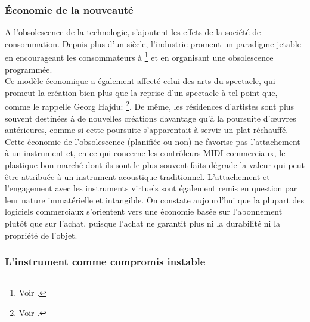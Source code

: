 
\subsubsection{Économie de la nouveauté}

\noindent A l'obsolescence de la technologie, s'ajoutent les effets de la société de consommation. Depuis plus d'un siècle, l'industrie promeut un paradigme jetable en encourageant les consommateurs à \footnote{Voir \cite{slade_made_2006}.} et en organisant une obsolescence programmée.\\
\indent Ce modèle économique a également affecté celui des arts du spectacle, qui promeut la création bien plus que la reprise d'un spectacle à tel point que, comme le rappelle Georg Hajdu: \footnote{Voir \cite{hajdu_disposable_2016}.}. De même, les résidences d'artistes sont plus souvent destinées à de nouvelles créations davantage qu'à la poursuite d'œuvres antérieures, comme si cette poursuite s'apparentait à servir un plat réchauffé.\\
\indent Cette économie de l'obsolescence (planifiée ou non) ne favorise pas l'attachement à un instrument et, en ce qui concerne les contrôleurs \gls{MIDI} commerciaux, le plastique bon marché dont ils sont le plus souvent faits dégrade la valeur qui peut être attribuée à un instrument acoustique traditionnel. L'attachement et l'engagement avec les instruments virtuels sont également remis en question par leur nature immatérielle et intangible. On constate aujourd'hui que la plupart des logiciels commerciaux s'orientent vers une économie basée sur l'abonnement plutôt que sur l'achat, puisque l'achat ne garantit plus ni la durabilité ni la propriété de l'objet.

	
\subsubsection{L'instrument comme compromis instable}

